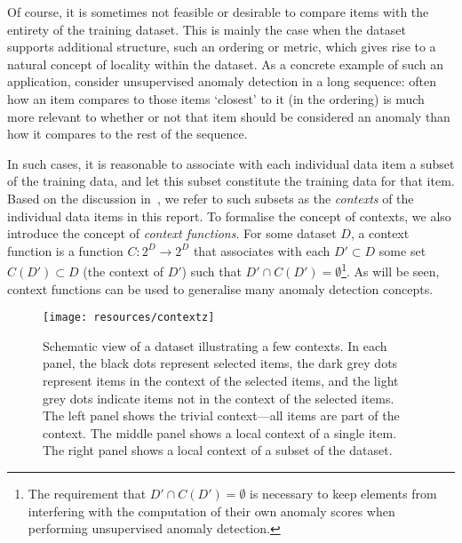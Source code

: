 Of course, it is sometimes not feasible or desirable to compare items with the entirety of the training dataset. This is mainly the case when the dataset supports additional structure, such an ordering or metric, which gives rise to a natural concept of locality within the dataset. As a concrete example of such an application, consider unsupervised anomaly detection in a long sequence: often how an item compares to those items `closest' to it (in the ordering) is much more relevant to whether or not that item should be considered an anomaly than how it compares to the rest of the sequence.

In such cases, it is reasonable to associate with each individual data item a subset of the training data, and let this subset constitute the training data for that item. Based on the discussion in~\cite{chandola}, we refer to such subsets as the \emph{contexts} of the individual data items in this report. To formalise the concept of contexts, we also introduce the concept of \emph{context functions}. For some dataset $D$, a context function is a function $C: 2^D \rightarrow 2^D$ that associates with each $D' \subset D$ some set $C(D') \subset D$ (the context of $D'$) such that $D' \cap C(D') = \emptyset$\footnote{The requirement that $D' \cap C(D') = \emptyset$ is necessary to keep elements from interfering with the computation of their own anomaly scores when performing unsupervised anomaly detection.}. As will be seen, context functions can be used to generalise many anomaly detection concepts.

\begin{figure}[thb]
    \vspace{-4pt}
    \begin{center}
        \leavevmode
        \texttt{[image: resources/contextz]}
    \end{center}
    \vspace{-15pt}
    \caption{{\small Schematic view of a dataset illustrating a few contexts. In each panel, the black dots represent selected items, the dark grey dots represent items in the context of the selected items, and the light grey dots indicate items not in the context of the selected items. The left panel shows the trivial context---all items are part of the context. The middle panel shows a local context of a single item. The right panel shows a local context of a subset of the dataset.}}
\label{fig:contexts}
    \vspace{-5pt}
\end{figure}

